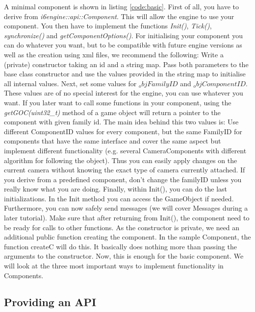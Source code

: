 \documentclass{article}
\begin{document}
A minimal component is shown in listing \ref{code:basic}. First of all, you have to derive from \textit{i6engine::api::Component}. This will allow the engine to use your component. You then have to implement the functions \textit{Init()}, \textit{Tick()}, \textit{synchronize()} and \textit{getComponentOptions()}. For initialising your component you can do whatever you want, but to be compatible with future engine versions as well as the creation using xml files, we recommend the following: Write a (private) constructor taking an id and a string map. Pass both parameters to the base class constructor and use the values provided in the string map to initialise all internal values. Next, set some values for \textit{$_objFamilyID$} and \textit{$_objComponentID$}. These values are of no special interest for the engine, you can use whatever you want. If you later want to call some functions in your component, using the \textit{getGOC(uint32_t)} method of a game object will return a pointer to the component with given family id. The main idea behind this two values is: Use different ComponentID values for every component, but the same FamilyID for components that have the same interface and cover the same aspect but implement different functionality (e.g. several CameraComponents with different algorithm for following the object). Thus you can easily apply changes on the current camera without knowing the exact type of camera currently attached. If you derive from a predefined component, don't change the familyID unless you really know what you are doing. Finally, within Init(), you can do the last initializations. In the Init method you can access the GameObject if needed. Furthermore, you can now safely send messages (we will cover Messages during a later tutorial). Make sure that after returning from Init(), the component need to be ready for calls to other functions.\newline
As the constructor is private, we need an additional public function creating the component. In the sample Component, the function createC will do this. It basically does nothing more than passing the arguments to the constructor.\newline
Now, this is enough for the basic component. We will look at the three most important ways to implement functionality in Components.



\subsection{Providing an API}
\end{document}
